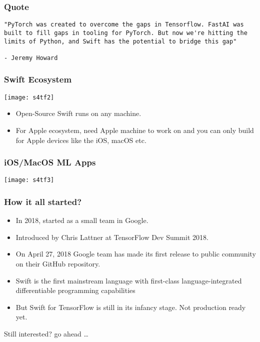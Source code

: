 \begin{frame}[fragile]\frametitle{Quote}
\begin{lstlisting}
"PyTorch was created to overcome the gaps in Tensorflow. FastAI was built to fill gaps in tooling for PyTorch. But now we're hitting the limits of Python, and Swift has the potential to bridge this gap"

- Jeremy Howard
\end{lstlisting}
\end{frame}


\begin{frame} \frametitle{Swift Ecosystem}
\begin{center}
\texttt{[image: s4tf2]}
\end{center}

\begin{itemize}
\item Open-Source Swift runs on any machine.
\item For Apple ecosystem, need Apple machine to work on and you can only build for Apple devices like the iOS, macOS etc.
\end{itemize}

\end{frame}

\begin{frame} \frametitle{iOS/MacOS ML Apps}
\begin{center}
\texttt{[image: s4tf3]}
\end{center}
\end{frame}

\begin{frame}[fragile] \frametitle{How it all started?}

\begin{itemize}
\item In 2018, started as a small team in Google.
\item Introduced by Chris Lattner at TensorFlow Dev Summit 2018. 
\item On April 27, 2018 Google team has made its first release to public community on their GitHub repository. 
\item Swift is the first mainstream language with first-class language-integrated differentiable programming capabilities
\item But Swift for TensorFlow is still in its infancy stage. Not production ready yet.
\end{itemize}

Still interested? go ahead \ldots

\end{frame}

